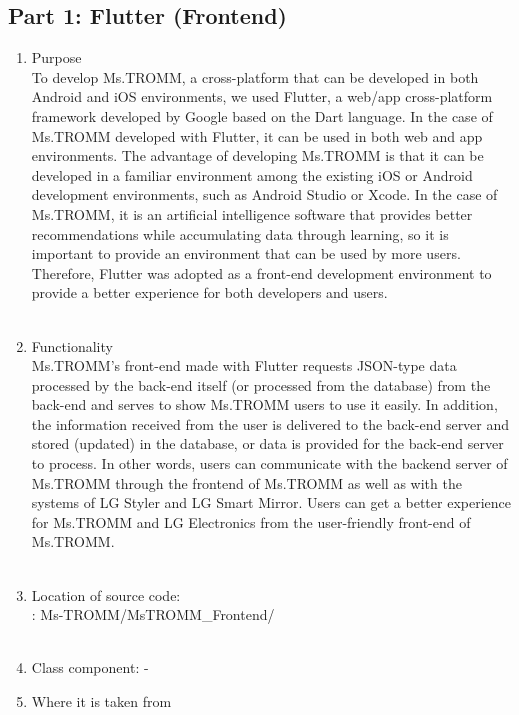 \documentclass[conference]{IEEEtran}
\begin{document}
\subsection{Part 1: Flutter (Frontend)}
\begin{enumerate}
    \item Purpose\\
    To develop Ms.TROMM, a cross-platform that can be developed in both Android and iOS environments, we used Flutter, a web/app cross-platform framework developed by Google based on the Dart language. In the case of Ms.TROMM developed with Flutter, it can be used in both web and app environments. The advantage of developing Ms.TROMM is that it can be developed in a familiar environment among the existing iOS or Android development environments, such as Android Studio or Xcode. In the case of Ms.TROMM, it is an artificial intelligence software that provides better recommendations while accumulating data through learning, so it is important to provide an environment that can be used by more users. Therefore, Flutter was adopted as a front-end development environment to provide a better experience for both developers and users. \\ \\
    \item Functionality\\
    Ms.TROMM's front-end made with Flutter requests JSON-type data processed by the back-end itself (or processed from the database) from the back-end and serves to show Ms.TROMM users to use it easily. In addition, the information received from the user is delivered to the back-end server and stored (updated) in the database, or data is provided for the back-end server to process. In other words, users can communicate with the backend server of Ms.TROMM through the frontend of Ms.TROMM as well as with the systems of LG Styler and LG Smart Mirror. Users can get a better experience for Ms.TROMM and LG Electronics from the user-friendly front-end of Ms.TROMM. \\ \\
    \item Location of source code: \\: Ms-TROMM/MsTROMM\_Frontend/ \\ \\
    \item Class component: - \\
    \item Where it is taken from\\

\end{enumerate}
\end{document}
